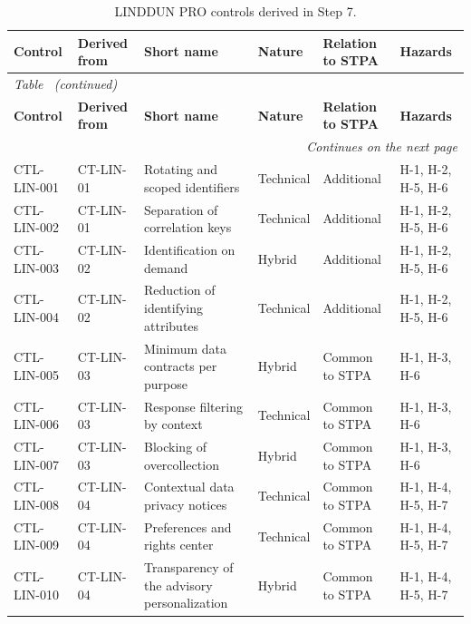 \begin{footnotesize}
\begin{longtable}{l p{} p{} p{} p{} p{}}
    \caption[LINDDUN PRO controls derived in Step 7]{LINDDUN PRO controls derived in Step 7.}
    \label{tab:linddun_lista_controles} \\
    \hline
    \textbf{Control} & \textbf{Derived from} & \textbf{Short name} & \textbf{Nature} & \textbf{Relation to STPA} & \textbf{Hazards} \\
    \hline
    \endfirsthead
    \multicolumn{6}{l}{\small\emph{Table~\thetable{} (continued)}} \\
    \hline
    \textbf{Control} & \textbf{Derived from} & \textbf{Short name} & \textbf{Nature} & \textbf{Relation to STPA} & \textbf{Hazards} \\
    \hline
    \endhead
    \hline
    \multicolumn{6}{r}{\small\emph{Continues on the next page}} \\
    \endfoot
    \hline
    \endlastfoot
        CTL-LIN-001 & CT-LIN-01 & Rotating and scoped identifiers & Technical & Additional & H-1, H-2, H-5, H-6 \\
        CTL-LIN-002 & CT-LIN-01 & Separation of correlation keys & Technical & Additional & H-1, H-2, H-5, H-6 \\
        CTL-LIN-003 & CT-LIN-02 & Identification on demand & Hybrid & Additional & H-1, H-2, H-5, H-6 \\
        CTL-LIN-004 & CT-LIN-02 & Reduction of identifying attributes & Technical & Additional & H-1, H-2, H-5, H-6 \\
        CTL-LIN-005 & CT-LIN-03 & Minimum data contracts per purpose & Hybrid & Common to STPA & H-1, H-3, H-6 \\
        CTL-LIN-006 & CT-LIN-03 & Response filtering by context & Technical & Common to STPA & H-1, H-3, H-6 \\
        CTL-LIN-007 & CT-LIN-03 & Blocking of overcollection & Hybrid & Common to STPA & H-1, H-3, H-6 \\
        CTL-LIN-008 & CT-LIN-04 & Contextual data privacy notices & Technical & Common to STPA & H-1, H-4, H-5, H-7 \\
        CTL-LIN-009 & CT-LIN-04 & Preferences and rights center & Technical & Common to STPA & H-1, H-4, H-5, H-7 \\
        CTL-LIN-010 & CT-LIN-04 & Transparency of the advisory personalization & Hybrid & Common to STPA & H-1, H-4, H-5, H-7 \\

\end{longtable}
\end{footnotesize}

